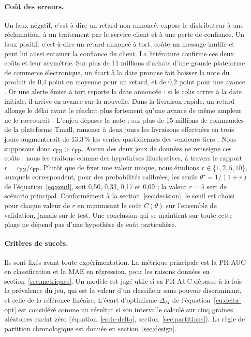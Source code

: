 \documentclass[11pt,a4paper]{article}
\theoremstyle{definition}
\begin{document}
\paragraph{Coût des erreurs.} Un faux négatif, c'est-à-dire un retard non annoncé, expose le distributeur à une réclamation, à un traitement par le service client et à une perte de confiance. Un faux positif, c'est-à-dire un retard annoncé à tort, coûte un message inutile et peut lui aussi entamer la confiance du client. La littérature confirme ces deux coûts et leur asymétrie. Sur plus de 11 millions d'achats d'une grande plateforme de commerce électronique, un écart à la date promise fait baisser la note du produit de 0,4 point en moyenne pour un retard, et de 0,2 point pour une avance \cite{nozari2026please}. Or une alerte émise à tort reporte la date annoncée : si le colis arrive à la date initiale, il arrive en avance sur la nouvelle. Dans la livraison rapide, un retard allonge le délai avant le réachat plus fortement qu'une avance de même ampleur ne le raccourcit \cite{harter2025effect}. L'enjeu dépasse la note : sur plus de 15 millions de commandes de la plateforme Tmall, ramener à deux jours les livraisons effectuées en trois jours augmenterait de 13,3\,\% les ventes quotidiennes des vendeurs tiers \cite{deshpande2023logistics}. Nous supposons donc $c_{\mathrm{FN}} > c_{\mathrm{FP}}$. Aucun des deux jeux de données ne renseigne ces coûts : nous les traitons comme des hypothèses illustratives, à travers le rapport $r = c_{\mathrm{FN}}/c_{\mathrm{FP}}$. Plutôt que de fixer une valeur unique, nous étudions $r \in \{1, 2, 5, 10\}$, auxquels correspondent, pour des probabilités calibrées, les seuils $\theta^\star = 1/(1+r)$ de l'équation~\eqref{eq:seuil}, soit 0,50, 0,33, 0,17 et 0,09 ; la valeur $r = 5$ sert de scénario principal. Conformément à la section~\ref{sec:decision}, le seuil est choisi pour chaque valeur de $r$ en minimisant le coût $C(\theta)$ sur l'ensemble de validation, jamais sur le test. Une conclusion qui se maintient sur toute cette plage ne dépend pas d'une hypothèse de coût particulière.

\paragraph{Critères de succès.} Ils sont fixés avant toute expérimentation. La métrique principale est la PR-AUC en classification et la MAE en régression, pour les raisons données en section~\ref{sec:metriques}. Un modèle est jugé utile si sa PR-AUC dépasse à la fois la prévalence du jeu, qui est la valeur d'un classifieur sans pouvoir discriminant, et celle de la référence linéaire. L'écart d'optimisme $\Delta_M$ de l'équation~\eqref{eq:delta-opt} est considéré comme un résultat si son intervalle calculé sur cinq graines aléatoires exclut zéro (équation~\eqref{eq:ic-delta}, section~\ref{sec:partitions}). La règle de partition chronologique est donnée en section~\ref{sec:design}.
\end{document}

